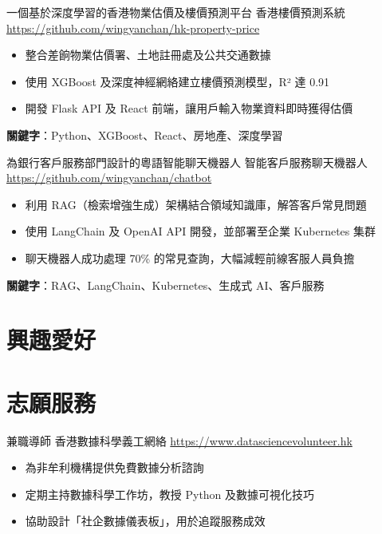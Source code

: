 \documentclass[a4paper, serif, 10pt]{moderncv}
\begin{document}
        {一個基於深度學習的香港物業估價及樓價預測平台}
        {香港樓價預測系統}
        {\url{https://github.com/wingyanchan/hk-property-price}}
        {}
        {\begin{itemize}
\item 整合差餉物業估價署、土地註冊處及公共交通數據
\item 使用 XGBoost 及深度神經網絡建立樓價預測模型，R² 達 0.91
\item 開發 Flask API 及 React 前端，讓用戶輸入物業資料即時獲得估價
\end{itemize}
\textbf{關鍵字}：Python、XGBoost、React、房地產、深度學習}

        {為銀行客戶服務部門設計的粵語智能聊天機器人}
        {智能客戶服務聊天機器人}
        {\url{https://github.com/wingyanchan/chatbot}}
        {}
        {\begin{itemize}
\item 利用 RAG（檢索增強生成）架構結合領域知識庫，解答客戶常見問題
\item 使用 LangChain 及 OpenAI API 開發，並部署至企業 Kubernetes 集群
\item 聊天機器人成功處理 70\% 的常見查詢，大幅減輕前線客服人員負擔
\end{itemize}
\textbf{關鍵字}：RAG、LangChain、Kubernetes、生成式 AI、客戶服務}
\section{興趣愛好}

\section{志願服務}

        {兼職導師}
        {香港數據科學義工網絡}
        {\url{https://www.datasciencevolunteer.hk}}
        {}
        {\begin{itemize}
\item 為非牟利機構提供免費數據分析諮詢
\item 定期主持數據科學工作坊，教授 Python 及數據可視化技巧
\item 協助設計「社企數據儀表板」，用於追蹤服務成效
\end{itemize}}
    
\end{document}
